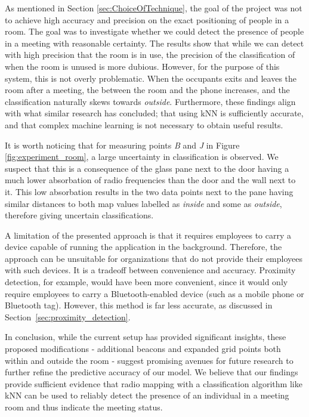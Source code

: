 As mentioned in Section \ref{sec:ChoiceOfTechnique}, the goal of the project was not to achieve high accuracy and precision on the exact positioning of people in a room. 
The goal was to investigate whether we could detect the presence of people in a meeting with reasonable certainty.
The results show that while we can detect with high precision that the room is in use, the precision of the classification of when the room is unused is more dubious. 
However, for the purpose of this system, this is not overly problematic. 
When the occupants exits and leaves the room after a meeting, the between the room and the phone increases, and the classification naturally skews towards \textit{outside}.
Furthermore, these findings align with what similar research has concluded; that using kNN is sufficiently accurate, and that complex machine learning is not necessary to obtain useful results.\cite{ble_kneares_neural}

It is worth noticing that for measuring points \textit{B} and \textit{J} in Figure \ref{fig:experiment_room}, a large uncertainty in classification is observed.
We suspect that this is a consequence of the glass pane next to the door having a much lower absorbation of radio frequencies than the door and the wall next to it.
This low absorbation results in the two data points next to the pane having similar distances to both map values labelled as \textit{inside} and some as \textit{outside}, therefore giving uncertain classifications.

A limitation of the presented approach is that it requires employees to carry a device capable of running the application in the background.
Therefore, the approach can be unsuitable for organizations that do not provide their employees with such devices.
It is a tradeoff between convenience and accuracy.
Proximity detection, for example, would have been more convenient, since it would only require employees to carry a Bluetooth-enabled device (such as a mobile phone or Bluetooth tag). However, this method is far less accurate, as discussed in Section~\ref{sec:proximity_detection}.


In conclusion, while the current setup has provided significant insights, these proposed modifications - additional beacons and expanded grid points both within and outside the room - suggest promising avenues for future research to further refine the predictive accuracy of our model.
We believe that our findings provide sufficient evidence that radio mapping with a classification algorithm like kNN can be used to reliably detect the presence of an individual in a meeting room and thus indicate the meeting status.